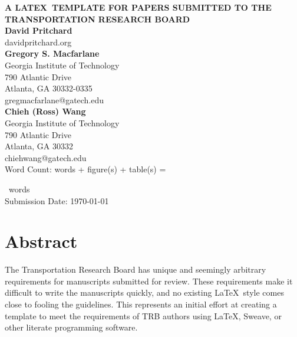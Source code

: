 \documentclass[titlepage,oneside,letterpage,12pt]{article}
\newcounter{totalwordcounter}
\newcounter{wordcounter}
\newcommand{\wordfigure}{250} %
\newcommand{\wordtable}{250} %
\newcommand{\totalwordcount}{%
  \wordcount*%
  \setcounter{totalwordcounter}{\value{wordcounter}}%
  \addtocounter{totalwordcounter}{\numexpr\wordfigure*\totvalue{figure}}%
  \addtocounter{totalwordcounter}{\numexpr\wordtable*\totvalue{table}} %
  \number\value{totalwordcounter}%
  \renewcommand{\totalwordcount}{\number\value{totalwordcounter}}%
}
\begin{document}



	
\thispagestyle{empty}


\begin{titlepage}
\begin{flushleft}

{\MakeUppercase{\bfseries A \LaTeX\ Template for Papers Submitted to the Transportation
Research Board}}\\[36pt]

{\bfseries David Pritchard} \\
davidpritchard.org\\[12pt]

{\bfseries Gregory S. Macfarlane}\\
Georgia Institute of Technology \\
790 Atlantic Drive \\
Atlanta, GA 30332-0335 \\
gregmacfarlane@gatech.edu\\[12pt]

{\bfseries Chieh (Ross) Wang}\\
Georgia Institute of Technology\\
790 Atlantic Drive\\
Atlanta, GA 30332\\
chiehwang@gatech.edu\\[60pt]

Word Count: \wordcount words +  figure(s) +  table(s) = \totalwordcount~words\\[12pt]

Submission Date: \today
\end{flushleft}
\end{titlepage}

\pagewiselinenumbers %

\newpage
\section{Abstract}

The Transportation Research Board has unique and seemingly arbitrary
requirements for manuscripts submitted for review. These requirements make it
difficult to write the manuscripts quickly, and no existing \LaTeX\ style comes
close to fooling the guidelines. This represents an initial effort at creating a
template to meet the requirements of TRB authors using \LaTeX, Sweave, or other
literate programming software.
\end{document}
